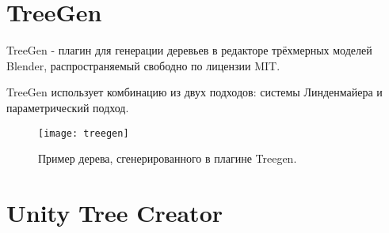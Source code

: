\newpage
\section{TreeGen}
TreeGen - плагин для генерации деревьев в редакторе трёхмерных моделей Blender, распространяемый свободно по лицензии MIT.

TreeGen использует комбинацию из двух подходов: системы Линденмайера и параметрический подход.

\begin{figure}[h]
    \centering
    \texttt{[image: treegen]}
    \caption{Пример дерева, сгенерированного в плагине Treegen.}
\end{figure}

\section{Unity Tree Creator}

\newpage
